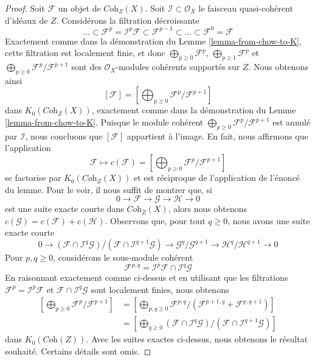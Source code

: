 \begin{proof}
Soit $\mathcal{F}$ un objet de $\textit{Coh}_Z(X)$.
Soit $\mathcal{I} \subset \mathcal{O}_X$ le faisceau quasi-cohérent
d'idéaux de $Z$. Considérons la filtration décroissante
$$
\ldots \subset
\mathcal{F}^p = \mathcal{I}^p \mathcal{F} \subset
\mathcal{F}^{p - 1} \subset \ldots \subset \mathcal{F}^0 = \mathcal{F}
$$
Exactement comme dans la démonstration du Lemme \ref{lemma-from-chow-to-K}, cette filtration
est localement finie, et donc
$\bigoplus_{p \geq 0} \mathcal{F}^p$,
$\bigoplus_{p \geq 1} \mathcal{F}^p$ et
$\bigoplus_{p \geq 0} \mathcal{F}^p/\mathcal{F}^{p + 1}$
sont des $\mathcal{O}_X$-modules cohérents supportés sur $Z$.
Nous obtenons ainsi
$$
[\mathcal{F}] =
[\bigoplus\nolimits_{p \geq 0} \mathcal{F}^p/\mathcal{F}^{p + 1}]
$$
dans $K_0(\textit{Coh}_Z(X))$, exactement comme dans la démonstration du
Lemme \ref{lemma-from-chow-to-K}. Puisque le module cohérent
$\bigoplus_{p \geq 0} \mathcal{F}^p/\mathcal{F}^{p + 1}$
est annulé par $\mathcal{I}$, nous concluons que
$[\mathcal{F}]$ appartient à l'image. En fait, nous affirmons que l'application
$$
\mathcal{F} \longmapsto 
c(\mathcal{F}) =
[\bigoplus\nolimits_{p \geq 0} \mathcal{F}^p/\mathcal{F}^{p + 1}]
$$
se factorise par $K_0(\textit{Coh}_Z(X))$ et est réciproque de
l'application de l'énoncé du lemme. Pour le voir, il nous
suffit de montrer que, si
$$
0 \to \mathcal{F} \to \mathcal{G} \to \mathcal{H} \to 0
$$
est une suite exacte courte dans $\textit{Coh}_Z(X)$, alors nous
obtenons $c(\mathcal{G}) = c(\mathcal{F}) + c(\mathcal{H})$.
Observons que, pour tout $q \geq 0$, nous avons une suite exacte courte
$$
0 \to
(\mathcal{F} \cap \mathcal{I}^q\mathcal{G})/
(\mathcal{F} \cap \mathcal{I}^{q + 1}\mathcal{G}) \to
\mathcal{G}^q/\mathcal{G}^{q + 1} \to
\mathcal{H}^q/\mathcal{H}^{q + 1} \to 0
$$
Pour $p, q \geq 0$, considérons le sous-module cohérent
$$
\mathcal{F}^{p, q} = \mathcal{I}^p\mathcal{F} \cap \mathcal{I}^q\mathcal{G}
$$
En raisonnant exactement comme ci-dessus et en utilisant que les filtrations
$\mathcal{F}^p = \mathcal{I}^p\mathcal{F}$ et
$\mathcal{F} \cap \mathcal{I}^q\mathcal{G}$ sont localement finies,
nous obtenons
$$
\begin{aligned}
[\bigoplus\nolimits_{p \geq 0} \mathcal{F}^p/\mathcal{F}^{p + 1}] &=
[\bigoplus\nolimits_{p, q \geq 0}
\mathcal{F}^{p, q}/(\mathcal{F}^{p + 1, q} + \mathcal{F}^{p, q + 1})] \\
&=
[\bigoplus\nolimits_{q \geq 0}
(\mathcal{F} \cap \mathcal{I}^q\mathcal{G})/
(\mathcal{F} \cap \mathcal{I}^{q + 1}\mathcal{G})]
\end{aligned}
$$
dans $K_0(\textit{Coh}(Z))$. Avec les suites exactes ci-dessus, nous obtenons
le résultat souhaité. Certains détails sont omis.
\end{proof}













